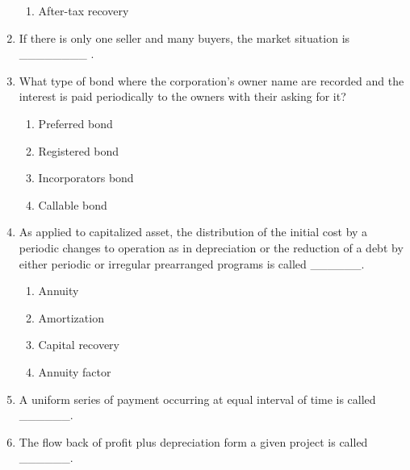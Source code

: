 \documentclass[11pt,a4paper]{article}
\begin{document}
\begin{enumerate}
\begin{enumerate}[label=\Alph*.]
\item{After-tax recovery}
\end{enumerate}
\item{If there is only one seller and many buyers, the market situation is \_\_\_\_\_\_\_\_ .}
\\
\item{What type of bond where the corporation's owner name are recorded and the interest is paid periodically to the owners with their asking for it?
}
\begin{enumerate}[label=\Alph*.]
\item{Preferred bond}
\item{Registered bond}
\item{Incorporators bond}
\item{Callable bond}
\end{enumerate}
\item{As applied to capitalized asset, the distribution of the initial cost by a periodic changes to operation as in depreciation or the reduction of a debt by either periodic or irregular prearranged programs is called \_\_\_\_\_\_.}
\begin{enumerate}[label=\Alph*.]
\item{Annuity}
\item{Amortization}
\item{Capital recovery}
\item{Annuity factor}
\end{enumerate}
\item{A uniform series of payment occurring at equal interval of time is called \_\_\_\_\_\_.}
\\
\item{The flow back of profit plus depreciation form a given project is called \_\_\_\_\_\_.}
\begin{enumerate}[label=\Alph*.]

\end{enumerate}
\end{enumerate}
\end{document}
